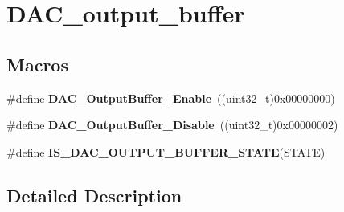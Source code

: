 \hypertarget{group___d_a_c__output__buffer}{\section{D\-A\-C\-\_\-output\-\_\-buffer}
\label{group___d_a_c__output__buffer}
}
\subsection*{Macros}
\begin{DoxyCompactItemize}
\item 
\hypertarget{group___d_a_c__output__buffer_gab3f92803a8b6bc5fb3e4859908b5161f}{\#define {\bfseries D\-A\-C\-\_\-\-Output\-Buffer\-\_\-\-Enable}~((uint32\-\_\-t)0x00000000)}\label{group___d_a_c__output__buffer_gab3f92803a8b6bc5fb3e4859908b5161f}

\item 
\hypertarget{group___d_a_c__output__buffer_gad41f919d7141398cfdedf8218ce64450}{\#define {\bfseries D\-A\-C\-\_\-\-Output\-Buffer\-\_\-\-Disable}~((uint32\-\_\-t)0x00000002)}\label{group___d_a_c__output__buffer_gad41f919d7141398cfdedf8218ce64450}

\item 
\#define {\bfseries I\-S\-\_\-\-D\-A\-C\-\_\-\-O\-U\-T\-P\-U\-T\-\_\-\-B\-U\-F\-F\-E\-R\-\_\-\-S\-T\-A\-T\-E}(S\-T\-A\-T\-E)
\end{DoxyCompactItemize}


\subsection{Detailed Description}


